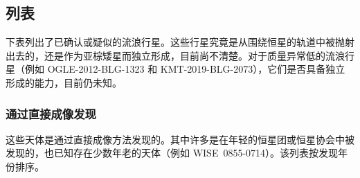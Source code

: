 \subsection{列表}
下表列出了已确认或疑似的流浪行星。这些行星究竟是从围绕恒星的轨道中被抛射出去的，还是作为亚棕矮星而独立形成，目前尚不清楚。对于质量异常低的流浪行星（例如 OGLE-2012-BLG-1323 和 KMT-2019-BLG-2073），它们是否具备独立形成的能力，目前仍未知。
\subsubsection{通过直接成像发现}
这些天体是通过直接成像方法发现的。其中许多是在年轻的恒星团或恒星协会中被发现的，也已知存在少数年老的天体（例如 WISE~0855-0714）。该列表按发现年份排序。

